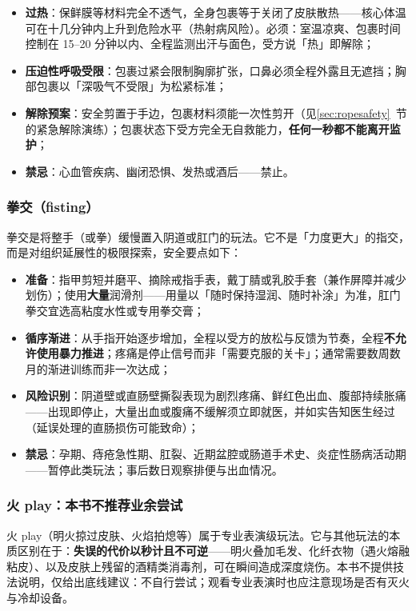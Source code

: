 \documentclass[12pt,UTF8]{ctexbook}
\begin{document}
\begin{itemize}
\item \textbf{过热}：保鲜膜等材料完全不透气，全身包裹等于关闭了皮肤散热——核心体温可在十几分钟内上升到危险水平（热射病风险）。必须：室温凉爽、包裹时间控制在 15--20 分钟以内、全程监测出汗与面色，受方说「热」即解除；
\item \textbf{压迫性呼吸受限}：包裹过紧会限制胸廓扩张，口鼻必须全程外露且无遮挡；胸部包裹以「深吸气不受限」为松紧标准；
\item \textbf{解除预案}：安全剪置于手边，包裹材料须能一次性剪开（见\ref{sec:ropesafety}~节的紧急解除演练）；包裹状态下受方完全无自救能力，\textbf{任何一秒都不能离开监护}；
\item \textbf{禁忌}：心血管疾病、幽闭恐惧、发热或酒后——禁止。
\end{itemize}

\subsubsection{拳交（fisting）}

拳交是将整手（或拳）缓慢置入阴道或肛门的玩法。它不是「力度更大」的指交，而是对组织延展性的极限探索，安全要点如下：

\begin{itemize}
\item \textbf{准备}：指甲剪短并磨平、摘除戒指手表，戴丁腈或乳胶手套（兼作屏障并减少划伤）；使用\textbf{大量}润滑剂——用量以「随时保持湿润、随时补涂」为准，肛门拳交宜选高粘度水性或专用拳交膏；
\item \textbf{循序渐进}：从手指开始逐步增加，全程以受方的放松与反馈为节奏，全程\textbf{不允许使用暴力推进}；疼痛是停止信号而非「需要克服的关卡」；通常需要数周数月的渐进训练而非一次达成；
\item \textbf{风险识别}：阴道壁或直肠壁撕裂表现为剧烈疼痛、鲜红色出血、腹部持续胀痛——出现即停止，大量出血或腹痛不缓解须立即就医，并如实告知医生经过（延误处理的直肠损伤可能致命）；
\item \textbf{禁忌}：孕期、痔疮急性期、肛裂、近期盆腔或肠道手术史、炎症性肠病活动期——暂停此类玩法；事后数日观察排便与出血情况。
\end{itemize}

\subsubsection{火 play：本书不推荐业余尝试}

火 play（明火掠过皮肤、火焰拍熄等）属于专业表演级玩法。它与其他玩法的本质区别在于：\textbf{失误的代价以秒计且不可逆}——明火叠加毛发、化纤衣物（遇火熔融粘皮）、以及皮肤上残留的酒精类消毒剂，可在瞬间造成深度烧伤。本书不提供技法说明，仅给出底线建议：不自行尝试；观看专业表演时也应注意现场是否有灭火与冷却设备。
\end{document}
